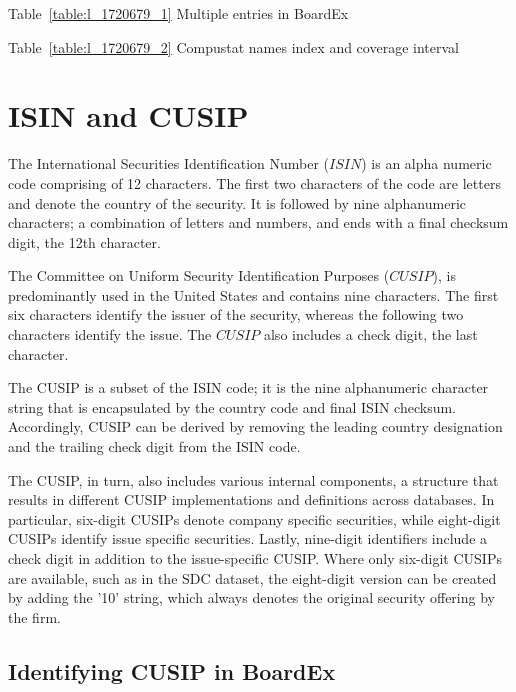 \documentclass[12pt]{article}
\begin{document}
\begin{center}
Table~\ref{table:l_1720679_1} Multiple entries in BoardEx\label{table:l_1720679_1}

\end{center}

\begin{center}
Table~\ref{table:l_1720679_2} Compustat names index and coverage interval\label{table:l_1720679_2}

\end{center}

\section{ISIN and CUSIP}\label{sec:ISINCUSIP}

The International Securities Identification Number ($ISIN$) is an alpha numeric code comprising of 12 characters.
The first two characters of the code are letters and denote the country of the security.
It is followed by nine alphanumeric characters; a combination of letters and numbers, and ends with a final checksum digit, the 12th character.

The Committee on Uniform Security Identification Purposes ($CUSIP$), is predominantly used in the United States and contains nine characters.
The first six characters identify the issuer of the security, whereas the following two characters identify the issue.
The $CUSIP$ also includes a check digit, the last character.

The CUSIP is a subset of the ISIN code; it is the nine alphanumeric character string that is encapsulated by the country code and final ISIN checksum.
Accordingly, CUSIP can be derived by removing the leading country designation and the trailing check digit from the ISIN code.

The CUSIP, in turn, also includes various internal components, a structure that results in different CUSIP implementations and definitions across databases. 
In particular, six-digit CUSIPs denote company specific securities, while eight-digit CUSIPs identify issue specific securities.
Lastly, nine-digit identifiers include a check digit in addition to the issue-specific CUSIP.
Where only six-digit CUSIPs are available, such as in the SDC dataset, the eight-digit version can be created by adding the '10' string, which always denotes the original security offering by the firm.


\subsection{Identifying CUSIP in BoardEx}\label{sec:BECUSIP}
\end{document}
